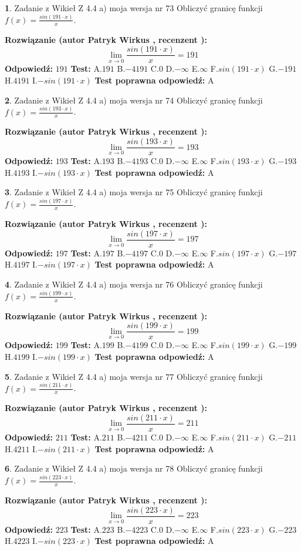 \documentclass[12pt, a4paper]{article}
\theoremstyle{definition} %
\newtheorem{zad}{}
\newcommand{\zadStart}[1]{\begin{zad}#1\newline}
\newcommand{\zadStop}{\end{zad}}
\newcommand{\rozwStart}[2]{\noindent \textbf{Rozwiązanie (autor #1 , recenzent #2): }\newline}
\newcommand{\rozwStop}{\newline}
\newcommand{\odpStart}{\noindent \textbf{Odpowiedź:}\newline}
\newcommand{\odpStop}{\newline}
\newcommand{\testStart}{\noindent \textbf{Test:}\newline}
\newcommand{\testStop}{\newline}
\newcommand{\kluczStart}{\noindent \textbf{Test poprawna odpowiedź:}\newline}
\newcommand{\kluczStop}{\newline}
\begin{document}
\zadStart{Zadanie z Wikieł Z 4.4 a) moja wersja nr 73}
Obliczyć granicę funkcji $f(x)=\frac{sin(191\cdot x)}{x}$.
\zadStop
\rozwStart{Patryk Wirkus}{}
$$\lim\limits_{x\to 0}\frac{sin(191\cdot x)}{x}=
191$$
\rozwStop
\odpStart
$191$
\odpStop
\testStart
A.$191$
B.$-4191$
C.$0$
D.$-\infty$
E.$\infty$
F.$sin(191\cdot x)$
G.$-191$
H.$4191$
I.$-sin(191\cdot x)$
\testStop
\kluczStart
A
\kluczStop



\zadStart{Zadanie z Wikieł Z 4.4 a) moja wersja nr 74}
Obliczyć granicę funkcji $f(x)=\frac{sin(193\cdot x)}{x}$.
\zadStop
\rozwStart{Patryk Wirkus}{}
$$\lim\limits_{x\to 0}\frac{sin(193\cdot x)}{x}=
193$$
\rozwStop
\odpStart
$193$
\odpStop
\testStart
A.$193$
B.$-4193$
C.$0$
D.$-\infty$
E.$\infty$
F.$sin(193\cdot x)$
G.$-193$
H.$4193$
I.$-sin(193\cdot x)$
\testStop
\kluczStart
A
\kluczStop



\zadStart{Zadanie z Wikieł Z 4.4 a) moja wersja nr 75}
Obliczyć granicę funkcji $f(x)=\frac{sin(197\cdot x)}{x}$.
\zadStop
\rozwStart{Patryk Wirkus}{}
$$\lim\limits_{x\to 0}\frac{sin(197\cdot x)}{x}=
197$$
\rozwStop
\odpStart
$197$
\odpStop
\testStart
A.$197$
B.$-4197$
C.$0$
D.$-\infty$
E.$\infty$
F.$sin(197\cdot x)$
G.$-197$
H.$4197$
I.$-sin(197\cdot x)$
\testStop
\kluczStart
A
\kluczStop



\zadStart{Zadanie z Wikieł Z 4.4 a) moja wersja nr 76}
Obliczyć granicę funkcji $f(x)=\frac{sin(199\cdot x)}{x}$.
\zadStop
\rozwStart{Patryk Wirkus}{}
$$\lim\limits_{x\to 0}\frac{sin(199\cdot x)}{x}=
199$$
\rozwStop
\odpStart
$199$
\odpStop
\testStart
A.$199$
B.$-4199$
C.$0$
D.$-\infty$
E.$\infty$
F.$sin(199\cdot x)$
G.$-199$
H.$4199$
I.$-sin(199\cdot x)$
\testStop
\kluczStart
A
\kluczStop



\zadStart{Zadanie z Wikieł Z 4.4 a) moja wersja nr 77}
Obliczyć granicę funkcji $f(x)=\frac{sin(211\cdot x)}{x}$.
\zadStop
\rozwStart{Patryk Wirkus}{}
$$\lim\limits_{x\to 0}\frac{sin(211\cdot x)}{x}=
211$$
\rozwStop
\odpStart
$211$
\odpStop
\testStart
A.$211$
B.$-4211$
C.$0$
D.$-\infty$
E.$\infty$
F.$sin(211\cdot x)$
G.$-211$
H.$4211$
I.$-sin(211\cdot x)$
\testStop
\kluczStart
A
\kluczStop



\zadStart{Zadanie z Wikieł Z 4.4 a) moja wersja nr 78}
Obliczyć granicę funkcji $f(x)=\frac{sin(223\cdot x)}{x}$.
\zadStop
\rozwStart{Patryk Wirkus}{}
$$\lim\limits_{x\to 0}\frac{sin(223\cdot x)}{x}=
223$$
\rozwStop
\odpStart
$223$
\odpStop
\testStart
A.$223$
B.$-4223$
C.$0$
D.$-\infty$
E.$\infty$
F.$sin(223\cdot x)$
G.$-223$
H.$4223$
I.$-sin(223\cdot x)$
\testStop
\kluczStart
A
\kluczStop
\end{document}
